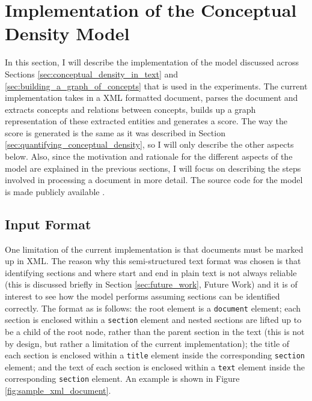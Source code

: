 \documentclass[12pt]{article}
\theoremstyle{grammarstyle}
\begin{document}
\section{Implementation of the Conceptual Density Model} \label{sec:implementation_of_the_conceptual_density_model}
In this section, I will describe the implementation of the model discussed across Sections \ref{sec:conceptual_density_in_text} and \ref{sec:building_a_graph_of_concepts} that is used in the experiments. The current implementation takes in a XML formatted document, parses the document and extracts concepts and relations between concepts, builds up a graph representation of these extracted entities and generates a score. The way the score is generated is the same as it was described in Section \ref{sec:quantifying_conceptual_density}, so I will only describe the other aspects below.
Also, since the motivation and rationale for the different aspects of the model are explained in the previous sections, I will focus on describing the steps involved in processing a document in more detail. The source code for the model is made publicly available \cite{anthony_dickson_2019_3458623}.

\subsection{Input Format}
One limitation of the current implementation is that documents must be marked up in XML. The reason why this semi-structured text format was chosen is that identifying sections and where start and end in plain text is not always reliable (this is discussed briefly in Section \ref{sec:future_work}, Future Work) and it is of interest to see how the model performs assuming sections can be identified correctly. The format as is follows: the root element is a \texttt{document} element; each section is enclosed within a \texttt{section} element and nested sections are lifted up to be a child of the root node, rather than the parent section in the text (this is not by design, but rather a limitation of the current implementation); the title of each section is enclosed within a \texttt{title} element inside the corresponding \texttt{section} element; and the text of each section is enclosed within a \texttt{text} element inside the corresponding \texttt{section} element.
An example is shown in Figure \ref{fig:sample_xml_document}.
\end{document}
